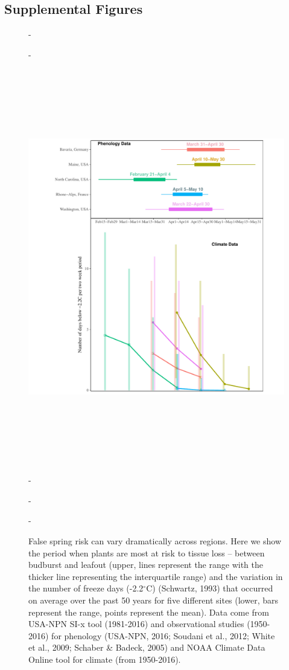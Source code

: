 \documentclass{article}\usepackage[]{graphicx}\usepackage[]{color}
\begin{document}
\subsection*{Supplemental Figures}
\begin{figure} [H] 
 -\begin{center}
 -\includegraphics[width=16cm, height=18cm]{..//figure/RegRisk_flipped.pdf} 
 -\caption{False spring risk can vary dramatically across regions. Here we show the period when plants are most at risk to tissue loss -- between budburst and leafout (upper, lines represent the range with the thicker line representing the interquartile range) and the variation in the number of freeze days (-2.2$^{\circ}$C) (Schwartz, 1993) that occurred on average over the past 50 years for five different sites (lower, bars represent the range, points represent the mean). Data come from USA-NPN SI-x tool (1981-2016) and observational studies (1950-2016) for phenology (USA-NPN, 2016; Soudani et al., 2012; White et al., 2009; Schaber \& Badeck, 2005) and NOAA Climate Data Online tool for climate (from 1950-2016). } \label{fig:regional}  
 -\end{center}
 -\end{figure}


\newpage
\nocite{Flynn}

\end{document}
